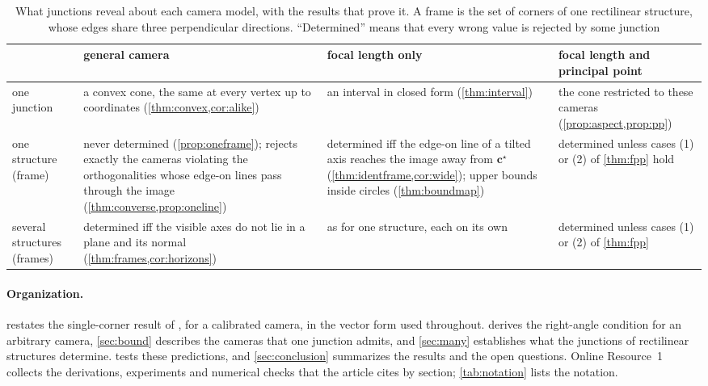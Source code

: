 \documentclass[pdflatex,sn-mathphys-num,iicol]{sn-jnl}
\newcommand{\vc}{\mathbf{c}}
\newcommand{\OR}{Online Resource~1}
\theoremstyle{thmstyleone}
\theoremstyle{thmstylethree}
\theoremstyle{thmstyletwo}
\begin{document}
\begin{table}[t]
\centering\small
\caption{What junctions reveal about each camera model, with the results that prove it. A frame is the set of corners of one rectilinear structure, whose edges share three perpendicular directions. ``Determined'' means that every wrong value is rejected by some junction}
\label{tab:roadmap}
\begin{tabularx}{\linewidth}{@{}l >{\raggedright\arraybackslash}X >{\raggedright\arraybackslash}X >{\raggedright\arraybackslash}X@{}}
\toprule
 & general camera & focal length only & focal length and principal point\\
\midrule
one junction & a convex cone, the same at every vertex up to coordinates (\cref{thm:convex,cor:alike}) & an interval in closed form (\cref{thm:interval}) & the cone restricted to these cameras (\cref{prop:aspect,prop:pp})\\
one structure (frame) & never determined (\cref{prop:oneframe}); rejects exactly the cameras violating the orthogonalities whose edge-on lines pass through the image (\cref{thm:converse,prop:oneline}) & determined iff the edge-on line of a tilted axis reaches the image away from $\vc^{\star}$ (\cref{thm:identframe,cor:wide}); upper bounds inside circles (\cref{thm:boundmap}) & determined unless cases (1) or (2) of \cref{thm:fpp} hold\\
several structures (frames) & determined iff the visible axes do not lie in a plane and its normal (\cref{thm:frames,cor:horizons}) & as for one structure, each on its own & determined unless cases (1) or (2) of \cref{thm:fpp}\\
\bottomrule
\end{tabularx}
\end{table}

\paragraph{Organization.}  restates the single-corner result of \citet{kanatani1988}, for a calibrated camera, in the vector form used throughout.  derives the right-angle condition for an arbitrary camera, \cref{sec:bound} describes the cameras that one junction admits, and \cref{sec:many} establishes what the junctions of rectilinear structures determine.  tests these predictions, and \cref{sec:conclusion} summarizes the results and the open questions. \OR{} collects the derivations, experiments and numerical checks that the article cites by section; \cref{tab:notation} lists the notation.
\end{document}
